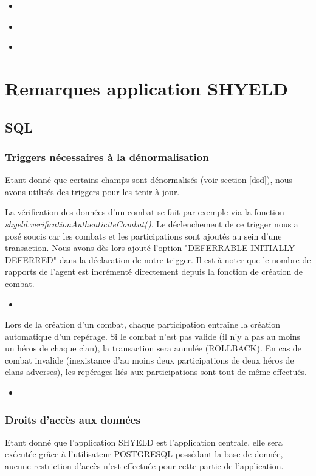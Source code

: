 \documentclass{article}[12pt]
\newcommand{\SQLcode}[2]{
	\begin{itemize}
		\item[]
	\end{itemize}
}
\begin{document}
\SQLcode{affichage_agents}{Afficher le contenu de la table shyeld.agents}

\SQLcode{affichage_combats}{Afficher le contenu de la table shyeld.combats}

\SQLcode{affichage_reperages}{Afficher le contenu de la table shyeld.reperages}
    \newpage
	\section{Remarques application SHYELD}
	\label{shyield}
	\subsection{SQL}
		
	\subsubsection{Triggers nécessaires à la dénormalisation}
	
Etant donné que certains champs sont dénormalisés (voir section \ref{dsd}), nous avons utilisés des triggers pour les tenir à jour.

 La vérification des données d'un combat se fait par exemple via la fonction \textit{shyeld.verificationAuthenticiteCombat()}. Le déclenchement de ce trigger nous a posé soucis car les combats et les participations sont ajoutés au sein d'une transaction. Nous avons dès lors ajouté l'option "DEFERRABLE INITIALLY DEFERRED" dans la déclaration de notre trigger. Il est à noter que le nombre de rapports de l'agent est incrémenté directement depuis la fonction de création de combat.
 	\SQLcode{triggerCombat}{Trigger de vérification d'un combat}
 	
 Lors de la création d'un combat, chaque participation entraîne la création automatique d'un repérage. Si le combat n'est pas valide (il n'y a pas au moins un héros de chaque clan), la transaction sera annulée (ROLLBACK). En cas de combat invalide (inexistance d'au moins deux participations de deux héros de clans adverses), les repérages liés aux participations sont tout de même effectués.
 	\SQLcode{triggerReperage}{Trigger de création automatique de repérage en cas d'insertion d'une participation}
 
	
	\subsubsection{Droits d'accès aux données}
	Etant donné que l'application SHYELD est l'application centrale, elle sera exécutée grâce à l'utilisateur POSTGRESQL possédant la base de donnée, aucune restriction d'accès n'est effectuée pour cette partie de l'application.
	
\end{document}
